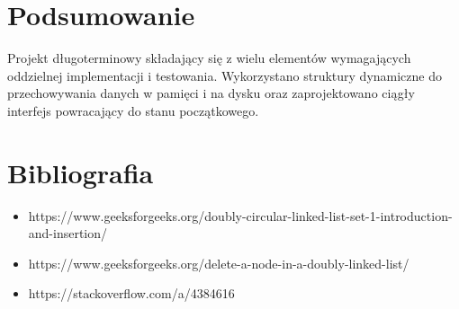 \documentclass[a4paper, 12pt]{article}
\begin{document}
\section*{Podsumowanie}
Projekt długoterminowy składający się z wielu elementów wymagających oddzielnej implementacji i testowania. Wykorzystano struktury dynamiczne do przechowywania danych w pamięci i na dysku oraz zaprojektowano ciągły interfejs powracający do stanu początkowego.

\section*{Bibliografia}
\begin{itemize}
    \item https://www.geeksforgeeks.org/doubly-circular-linked-list-set-1-introduction-and-insertion/
    \item https://www.geeksforgeeks.org/delete-a-node-in-a-doubly-linked-list/
    \item https://stackoverflow.com/a/4384616
\end{itemize}
\end{document}
